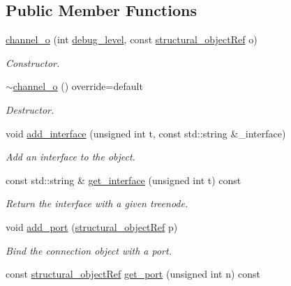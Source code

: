 \subsection*{Public Member Functions}
\begin{DoxyCompactItemize}
\item 
\hyperlink{classchannel__o_af663a17a3702a13f51ee81ef71debbe6}{channel\+\_\+o} (int \hyperlink{classstructural__object_ac2744292aa7f0fca3742133d16bb3201}{debug\+\_\+level}, const \hyperlink{structural__objects_8hpp_a8ea5f8cc50ab8f4c31e2751074ff60b2}{structural\+\_\+object\+Ref} o)
\begin{DoxyCompactList}\small\item\em Constructor. \end{DoxyCompactList}\item 
\hyperlink{classchannel__o_a6a859c7d153f4778b052d8daaf5e1c77}{$\sim$channel\+\_\+o} () override=default
\begin{DoxyCompactList}\small\item\em Destructor. \end{DoxyCompactList}\item 
void \hyperlink{classchannel__o_ab8492a177aaf78aaec1d521f29383793}{add\+\_\+interface} (unsigned int t, const std\+::string \&\+\_\+interface)
\begin{DoxyCompactList}\small\item\em Add an interface to the object. \end{DoxyCompactList}\item 
const std\+::string \& \hyperlink{classchannel__o_a1ce411d795342a195c0f13fa9adbae23}{get\+\_\+interface} (unsigned int t) const
\begin{DoxyCompactList}\small\item\em Return the interface with a given treenode. \end{DoxyCompactList}\item 
void \hyperlink{classchannel__o_a3b8469cc1a62c14d441aa9d1469aa158}{add\+\_\+port} (\hyperlink{structural__objects_8hpp_a8ea5f8cc50ab8f4c31e2751074ff60b2}{structural\+\_\+object\+Ref} p)
\begin{DoxyCompactList}\small\item\em Bind the connection object with a port. \end{DoxyCompactList}\item 
const \hyperlink{structural__objects_8hpp_a8ea5f8cc50ab8f4c31e2751074ff60b2}{structural\+\_\+object\+Ref} \hyperlink{classchannel__o_a8fe4c25a438c793c2ffb7e34c71df757}{get\+\_\+port} (unsigned int n) const

\end{DoxyCompactItemize}
